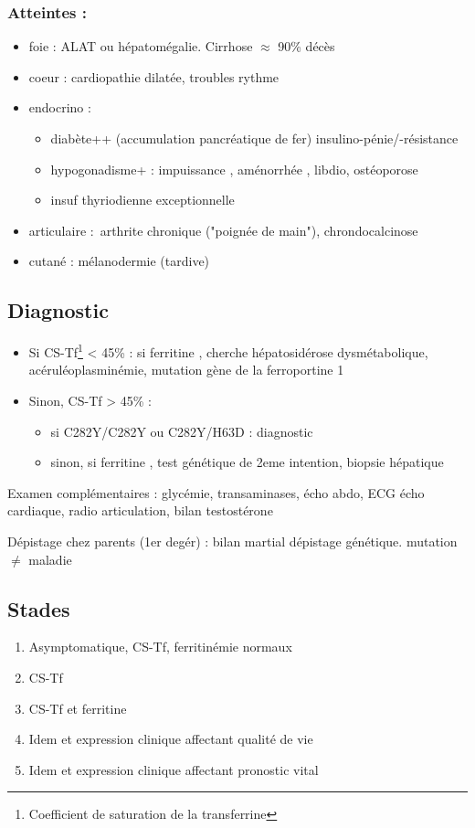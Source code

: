 \documentclass[11pt]{article}
\begin{document}
\subsubsection{Atteintes :}
\label{sec:org8844be6}
\begin{itemize}
\item foie : \inc ALAT ou hépatomégalie. Cirrhose \(\approx\) 90\% décès
\item coeur : cardiopathie dilatée, troubles rythme
\item endocrino :
\begin{itemize}
\item diabète++ (accumulation pancréatique de fer) insulino-pénie/-résistance
\item hypogonadisme+ : impuissance \male, aménorrhée \female, \dec libdio,
ostéoporose
\item insuf thyriodienne exceptionnelle
\end{itemize}
\item articulaire : arthrite chronique ("poignée de main"), chrondocalcinose
\item cutané : mélanodermie (tardive)
\end{itemize}


\subsection{Diagnostic}
\label{sec:org7b2c32a}
\begin{itemize}
\item Si CS-Tf\footnote{Coefficient de saturation de la transferrine} < 45\% : si ferritine \inc, cherche hépatosidérose dysmétabolique,
acéruléoplasminémie, mutation gène de la ferroportine 1
\item Sinon, CS-Tf > 45\% : 
\begin{itemize}
\item si C282Y/C282Y ou C282Y/H63D : diagnostic
\item sinon, si ferritine \inc, test génétique de 2eme intention, biopsie
hépatique
\end{itemize}
\end{itemize}

Examen complémentaires : glycémie, transaminases, écho abdo, ECG \textpm{} écho
cardiaque, radio articulation, bilan testostérone

Dépistage chez parents (1er degér) : bilan martial \textpm{} dépistage
génétique. \danger mutation \(\neq\) maladie

\subsection{Stades}
\label{sec:org0650c1c}
\begin{enumerate}
\item Asymptomatique, CS-Tf, ferritinémie normaux
\item CS-Tf \inc
\item CS-Tf \inc et ferritine \inc
\item Idem et expression clinique affectant qualité de vie
\item Idem et expression clinique affectant pronostic vital
\end{enumerate}
\end{document}
